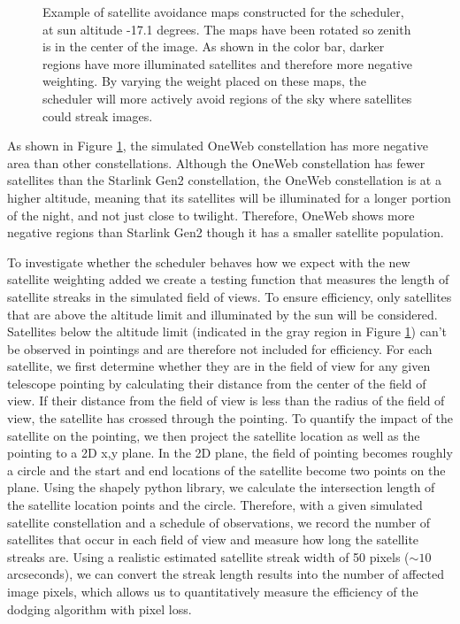 \documentclass[linenumbers]{aastex631}
\begin{document}
\begin{figure}[ht!]
\caption{Example of satellite avoidance maps constructed for the scheduler, at sun altitude -17.1 degrees. The maps have been rotated so zenith is in the center of the image. As shown in the color bar, darker regions have more illuminated satellites and therefore more negative weighting. By varying the weight placed on these maps, the scheduler will more actively avoid regions of the sky where satellites could streak images. \label{fig-simulated-scheduler}}
\end{figure}

As shown in Figure \ref{fig-simulated-scheduler}, the simulated OneWeb constellation has more negative area than other constellations. Although the OneWeb constellation has fewer satellites than the Starlink Gen2 constellation, the OneWeb constellation is at a higher altitude, meaning that its satellites will be illuminated for a longer portion of the night, and not just close to twilight. Therefore, OneWeb shows more negative regions than Starlink Gen2 though it has a smaller satellite population. 

To investigate whether the scheduler behaves how we expect with the new satellite weighting added we create a testing function that measures the length of satellite streaks in the simulated field of views. To ensure efficiency, only satellites that are above the altitude limit and illuminated by the sun will be considered. Satellites below the altitude limit (indicated in the gray region in Figure \ref{fig-simulated-scheduler}) can’t be observed in pointings and are therefore not included for efficiency. For each satellite, we first determine whether they are in the field of view for any given telescope pointing by calculating their distance from the center of the field of view. If their distance from the field of view is less than the radius of the field of view, the satellite has crossed through the pointing. To quantify the impact of the satellite on the pointing, we then project the satellite location as well as the pointing to a 2D x,y plane. In the 2D plane, the field of pointing becomes roughly a circle and the start and end locations of the satellite become two points on the plane. Using the shapely python library, we calculate the intersection length of the satellite location points and the circle. Therefore, with a given simulated satellite constellation and a schedule of observations, we record the number of satellites that occur in each field of view and measure how long the satellite streaks are. Using a realistic estimated satellite streak width of 50 pixels ($\sim10$ arcseconds), we can convert the streak length results into the number of affected image pixels, which allows us to quantitatively measure the efficiency of the dodging algorithm with pixel loss. 
\end{document}
